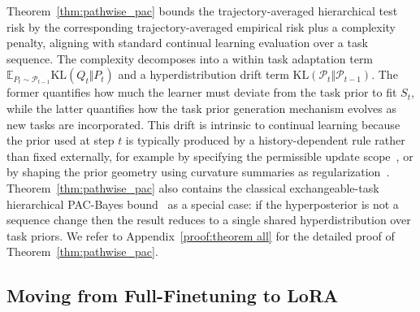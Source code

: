 \documentclass{article}
\theoremstyle{plain}
\theoremstyle{definition}
\theoremstyle{remark}
\begin{document}
Theorem~\ref{thm:pathwise_pac} bounds the trajectory-averaged hierarchical test risk by the corresponding trajectory-averaged empirical risk plus a complexity penalty, aligning with standard continual learning evaluation over a task sequence.
The complexity decomposes into a within task adaptation term $\mathbb E_{P_t\sim\mathcal P_{t-1}}\mathrm{KL}(Q_t\Vert P_t)$ and a hyperdistribution drift term $\mathrm{KL}(\mathcal P_t\Vert\mathcal P_{t-1})$. The former quantifies how much the learner must deviate from the task prior to fit $S_t$, while the latter quantifies how the task prior generation mechanism evolves as new tasks are incorporated.
This drift is intrinsic to continual learning because the prior used at step $t$ is typically produced by a history-dependent rule rather than fixed externally,
for example by specifying the permissible update scope~\citep{HAT2018,Supermasks2020,hu2022lora}, or by shaping the prior geometry using curvature summaries as regularization~\citep{EWC2017,SI2017}.
Theorem~\ref{thm:pathwise_pac} also contains the classical exchangeable-task hierarchical PAC-Bayes bound~\citep{pentinaPACBayesianBoundLifelong2014} as a special case: if the hyperposterior is not a sequence change then the result reduces to a single shared hyperdistribution over task priors. We refer to Appendix~\ref{proof:theorem all} for the detailed proof of Theorem~\ref{thm:pathwise_pac}.

\subsection{Moving from Full-Finetuning to LoRA}
\label{sec:kl-decomp-pecl}
\end{document}
